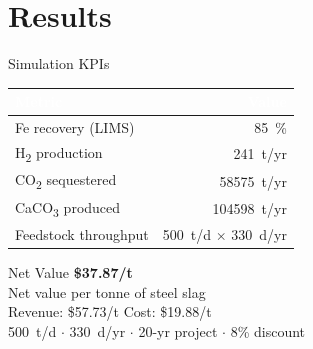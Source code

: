 \documentclass[aspectratio=169]{beamer}
\begin{document}
\section{Results}

\begin{frame}{Simulation KPIs}
\begin{table}
\centering
\begin{tabular}{@{}lr@{}}
\toprule
\textbf{\textcolor{white}{Metric}} & \textbf{\textcolor{white}{Value}} \\
\midrule
Fe recovery (LIMS) & \SI{85}{\percent} \\
H\textsubscript{2} production & \SI{241}{t/yr} \\
CO\textsubscript{2} sequestered & \num{58575}~t/yr \\
CaCO\textsubscript{3} produced & \num{104598}~t/yr \\
Feedstock throughput & \SI{500}{t/d} $\times$ \SI{330}{d/yr} \\
\bottomrule
\end{tabular}
\end{table}
\end{frame}

\begin{frame}{Net Value}
\centering
\vspace{2cm}
{\Huge\textbf{\textcolor{StepGreen}{\$37.87/t}}}\\[12pt]
{\large Net value per tonne of steel slag}\\[8pt]
{\normalsize
\textcolor{StepGreen}{Revenue: \$57.73/t} \quad
\textcolor{StepRed}{Cost: \$19.88/t}}\\[6pt]
{\small\textcolor{StepGrey}{\SI{500}{t/d} $\cdot$ \SI{330}{d/yr} $\cdot$ 20-yr project $\cdot$ 8\% discount}}
\end{frame}
\end{document}
